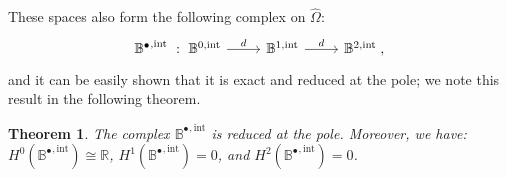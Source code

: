 \documentclass[10pt]{article}
\newcommand{\RR}{{\mathbb{R}}}
\newcommand{\isomorphic}{\cong}
\newcommand{\vSpace}[1]{\mathbb{#1}}
\newcommand{\complex}[1]{\mathit{\vSpace{#1}^\bullet}}
\newcommand{\tpDomain}{\widehat{\Omega}}
\newcommand{\bsp}{B}
\newcommand{\bspS}{\vSpace{\bsp}}
\newcommand{\tint}{\mathrm{int}}
\theoremstyle{plain}
\newtheorem{theorem}{Theorem}[section]
\theoremstyle{definition}
\theoremstyle{remark}
\begin{document}
These spaces also form the following complex on $\tpDomain$:
\begin{equation}
    \begin{tikzcd}
        \complex{\bsp}^{,\tint}~:~ \bspS^{0,\tint} \arrow{r}{d} & \bspS^{1,\tint} \arrow{r}{d} & \bspS^{2,\tint}\;,
    \end{tikzcd}
\end{equation}
and it can be easily shown that it is exact and reduced at the pole; we note this result in the following theorem.
\begin{theorem}\label{thm:intermediate-complex}
    The complex $\complex{\bsp}^{,\tint}$ is reduced at the pole.
    Moreover, we have:
    $H^0(\complex{{\bsp}}^{,\tint}) \isomorphic \RR$, $H^1(\complex{{\bsp}}^{,\tint}) = 0$, and $H^2(\complex{{\bsp}}^{,\tint}) = 0$.
\end{theorem}
\end{document}
